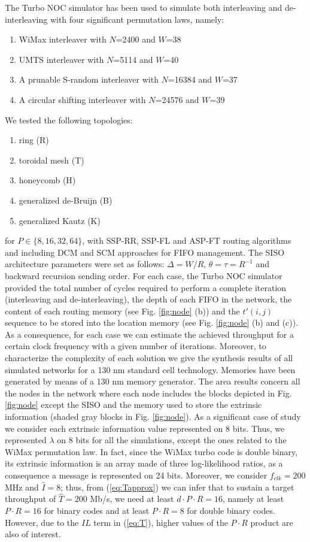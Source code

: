 \documentclass[10pt,twocolumn,journal]{IEEEtran}
\begin{document}
The Turbo NOC simulator has been used to simulate both interleaving and de-interleaving with four significant 
permutation laws, namely:
\begin{enumerate}
\item WiMax interleaver with $N$=2400 and $W$=38
\item UMTS interleaver with $N$=5114 and $W$=40
\item A prunable S-random interleaver \cite{dinoi_TCom05} with $N$=16384 and $W$=37
\item A circular shifting interleaver \cite{dolinar_TDA95} with $N$=24576 and $W$=39 \end{enumerate}
We tested the following topologies:
\begin{enumerate}
\item ring (R)
\item toroidal mesh (T)
\item honeycomb (H)
\item generalized de-Bruijn (B)
\item generalized Kautz (K)
\end{enumerate}
for $P \in \{8, 16, 32, 64\}$, with SSP-RR, SSP-FL and ASP-FT routing algorithms and including DCM and SCM 
approaches for FIFO management. The SISO architecture parameters were set as follows:
$\Delta=W/R$, $\theta=\tau=R^{-1}$ and backward recursion sending order.
For each case, the Turbo NOC simulator provided the total number of cycles required to perform a complete iteration
(interleaving and de-interleaving), the depth of each FIFO in the network, the content of each routing memory 
(see Fig. \ref{fig:node} (b)) and the $t'(i,j)$ sequence to be stored into the location memory 
(see Fig. \ref{fig:node} (b) and (c)). 
As a consequence, for each case we can estimate the achieved throughput for a certain clock frequency with a given 
number of iterations. Moreover, to characterize the complexity of each solution we give the synthesis results of 
all simulated networks for a 130 nm 
standard cell technology. Memories have been generated by means of a 130 nm memory generator. The area results concern  
all the nodes in the network where each node includes the blocks depicted in Fig. \ref{fig:node} except the SISO 
and the memory used to store the extrinsic information (shaded gray blocks in Fig. \ref{fig:node}).
As a significant case of study we consider each extrinsic information value represented on 8 bits. 
Thus, we represented $\lambda$ on 8 bits for all the simulations, except the 
ones related to the WiMax permutation law. In fact, since the WiMax turbo code is double binary, its extrinsic information 
is an array made of three log-likelihood ratios, as a consequence a message is represented on 24 bits. 
Moreover, we consider $f_{clk}=200$ MHz and $\hat{I}=8$; thus, from (\ref{eq:Tapprox}) we can infer that to sustain 
a target throughput of $\hat{T}=200$ Mb/s, we need at least $d \cdot P \cdot R = 16$, 
namely at least $P \cdot R = 16$ 
for binary codes and 
at least $P \cdot R = 8$ for double binary codes. However, due to the $IL$ term in (\ref{eq:T}), higher values 
of the $P \cdot R$ product are also of interest. 
\end{document}
